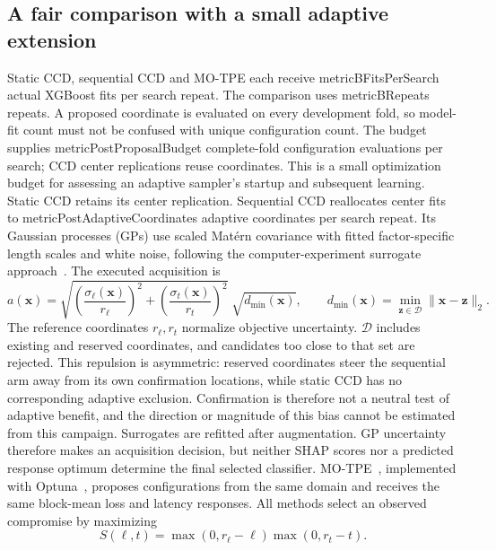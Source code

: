 \documentclass[12pt,a4paper]{article}
\newcommand{\m}[1]{\csname metric#1\endcsname}
\begin{document}
\subsection{A fair comparison with a small adaptive extension}
Static CCD, sequential CCD and MO-TPE each receive \m{BFitsPerSearch} actual XGBoost fits per search repeat. The comparison uses \m{BRepeats} repeats. A proposed coordinate is evaluated on every development fold, so model-fit count must not be confused with unique configuration count.
The budget supplies \m{PostProposalBudget} complete-fold configuration evaluations per search; CCD center replications reuse coordinates. This is a small optimization budget for assessing an adaptive sampler's startup and subsequent learning.
Static CCD retains its center replication. Sequential CCD reallocates center fits to \m{PostAdaptiveCoordinates} adaptive coordinates per search repeat. Its Gaussian processes (GPs) use scaled Mat\'ern covariance with fitted factor-specific length scales and white noise, following the computer-experiment surrogate approach~\cite{sacks,santner}. The executed acquisition is
\begin{equation}\label{eq:acquisition}
a(\mathbf{x})=\sqrt{\left(\frac{\sigma_\ell(\mathbf{x})}{r_\ell}\right)^2+\left(\frac{\sigma_t(\mathbf{x})}{r_t}\right)^2}\;\sqrt{d_{\min}(\mathbf{x})},\qquad
d_{\min}(\mathbf{x})=\min_{\mathbf{z}\in\mathcal D}\|\mathbf{x}-\mathbf{z}\|_2.
\end{equation}
The reference coordinates $r_\ell,r_t$ normalize objective uncertainty. $\mathcal D$ includes existing and reserved coordinates, and candidates too close to that set are rejected. This repulsion is asymmetric: reserved coordinates steer the sequential arm away from its own confirmation locations, while static CCD has no corresponding adaptive exclusion. Confirmation is therefore not a neutral test of adaptive benefit, and the direction or magnitude of this bias cannot be estimated from this campaign. Surrogates are refitted after augmentation. GP uncertainty therefore makes an acquisition decision, but neither SHAP scores nor a predicted response optimum determine the final selected classifier.
MO-TPE~\cite{motpe}, implemented with Optuna~\cite{optuna}, proposes configurations from the same domain and receives the same block-mean loss and latency responses. All methods select an observed compromise by maximizing
\begin{equation}\label{eq:selection}
S(\ell,t)=\max(0,r_\ell-\ell)\max(0,r_t-t).
\end{equation}
\end{document}
